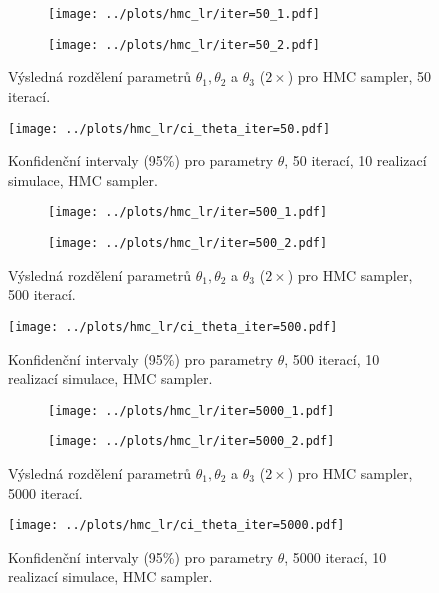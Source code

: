 \documentclass[11pt,oneside,american,czech]{article}
\begin{document}
\begin{figure}
	\centering
	\begin{subfigure}{0.95\textwidth}
		\centering
		\texttt{[image: ../plots/hmc\_lr/iter=50\_1.pdf]}
	\end{subfigure}
	
	\vspace{1.5cm}
	
	\begin{subfigure}{0.95\textwidth}
		\centering
		\texttt{[image: ../plots/hmc\_lr/iter=50\_2.pdf]}
	\end{subfigure}
	\caption{Výsledná rozdělení parametrů $\theta_1, \theta_2$ a $\theta_3$ ($2\times$) pro HMC sampler, 50 iterací.}
	\label{Obr: hmc LR 50}
\end{figure}

\begin{figure}
	\centering
	\texttt{[image: ../plots/hmc\_lr/ci\_theta\_iter=50.pdf]}
	\caption{Konfidenční intervaly (95\%) pro parametry $\theta$, 50 iterací, 10 realizací simulace, HMC sampler.}
	\label{HMC LR 50 CI}
\end{figure}

\begin{figure}
	\centering
	\begin{subfigure}{0.95\textwidth}
		\centering
		\texttt{[image: ../plots/hmc\_lr/iter=500\_1.pdf]}
	\end{subfigure}
	
	\vspace{1.5cm}
	
	\begin{subfigure}{0.95\textwidth}
		\centering
		\texttt{[image: ../plots/hmc\_lr/iter=500\_2.pdf]}
	\end{subfigure}
	\caption{Výsledná rozdělení parametrů $\theta_1, \theta_2$ a $\theta_3$ ($2\times$) pro HMC sampler, 500 iterací.}
	\label{Obr: hmc LR 500}
\end{figure}

\begin{figure}
	\centering
	\texttt{[image: ../plots/hmc\_lr/ci\_theta\_iter=500.pdf]}
	\caption{Konfidenční intervaly (95\%) pro parametry $\theta$, 500 iterací, 10 realizací simulace, HMC sampler.}
	\label{HMC LR 500 CI}
\end{figure}

\begin{figure}
	\centering
	\begin{subfigure}{0.95\textwidth}
		\centering
		\texttt{[image: ../plots/hmc\_lr/iter=5000\_1.pdf]}
	\end{subfigure}
	
	\vspace{1.5cm}
	
	\begin{subfigure}{0.95\textwidth}
		\centering
		\texttt{[image: ../plots/hmc\_lr/iter=5000\_2.pdf]}
	\end{subfigure}
	\caption{Výsledná rozdělení parametrů $\theta_1, \theta_2$ a $\theta_3$ ($2\times$) pro HMC sampler, 5000 iterací.}
	\label{Obr: hmc LR 5000}
\end{figure}

\begin{figure}
	\centering
	\texttt{[image: ../plots/hmc\_lr/ci\_theta\_iter=5000.pdf]}
	\caption{Konfidenční intervaly (95\%) pro parametry $\theta$, 5000 iterací, 10 realizací simulace, HMC sampler.}
	\label{HMC LR 5000 CI}
\end{figure}
\end{document}
